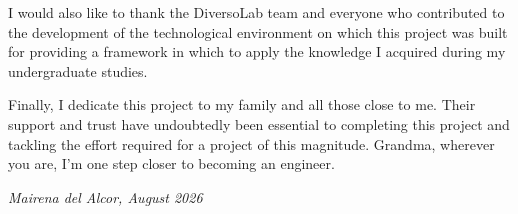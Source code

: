 I would also like to thank the DiversoLab team and everyone who contributed to the development of the technological environment on which this project was built for providing a framework in which to apply the knowledge I acquired during my undergraduate studies.

Finally, I dedicate this project to my family and all those close to me. Their support and trust have undoubtedly been essential to completing this project and tackling the effort required for a project of this magnitude. Grandma, wherever you are, I'm one step closer to becoming an engineer.


\begin{flushright}
\textit{Mairena del Alcor, August 2026}
\end{flushright}
